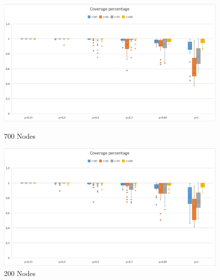 \begin{figure}[H]
  \includegraphics[width=\linewidth]{./images/Rate700Boxplot.png}
  \caption{700 Nodes}\label{fig:awesome_image1}
\endminipage\hfill
{}
  \includegraphics[width=\linewidth]{./images/Rate200Boxplot.png}
  \caption{200 Nodes}\label{fig:awesome_image2}
\endminipage
\end{figure}



